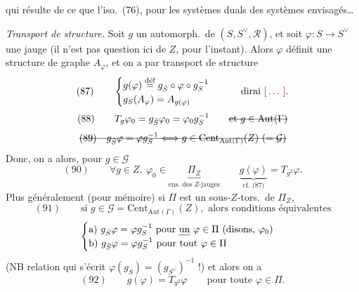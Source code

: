 \documentclass[11pt,a4paper]{article}
\begin{document}
qui résulte de ce que l'iso.\ (76), pour les systèmes
duals des systèmes envisagés…

\struck{\ill{} \ill{}}

\emph{Transport de structure.} Soit $g$ un automorph.\ de $(S, S^{\vee}, \mathcal{R})$,
et soit $\varphi : S \to S^{\vee}$ une jauge (il n'est pas question ici de $Z$,
pour l'instant). Alors $\varphi$ définit une structure de graphe $A_\varphi$, et
on a par transport de structure
\[
(87)\qquad
\begin{cases}
g(\varphi) \overset{\text{déf}}{=} g_{\check{S}} \circ \varphi \circ g_S^{-1} \\
g_S(A_\varphi) = A_{g(\varphi)}
\end{cases}
\qquad \text{dirai \ill{}.}
\]
\[
(88)\qquad T_g \varphi_0 = g_{\check{S}} \varphi_0 = \varphi_0 g_S^{-1}
\qquad \text{\struck{et $g \in \mathrm{Aut}(\Gamma)$}}
\]
\[
\text{\struck{$(89)\quad g_{\check{S}} \varphi = \varphi g_S^{-1} \Longleftrightarrow g \in \mathrm{Cent}_{\mathrm{Aut}(\Gamma)}(Z)\ (= \mathcal{G})$}}
\]
Donc, on a alors, pour $g \in \mathcal{G}$
\[
(90)\qquad \forall g \in Z,\ \varphi_0 \in \underbrace{\Pi_Z}_{\text{ens.\ des } Z\text{-jauges}}
\qquad \underbrace{g(\varphi)}_{\text{cf.\ (87)}} = T_{g^2}\varphi .
\]
Plus généralement (pour mémoire) si $\Pi$ est un sous-$Z$-tors.\ de $\Pi_Z$,
\[
(91)\qquad \text{si } g \in \mathcal{G} = \mathrm{Cent}_{\mathrm{Aut}(\Gamma)}(Z), \text{ alors conditions équivalentes}
\]
\[
\begin{cases}
\text{a) } g_{\check{S}} \varphi = \varphi g_S^{-1} \text{ pour \emph{un} } \varphi \in \Pi \ (\text{disons, } \varphi_0) \\
\text{b) } g_{\check{S}} \varphi = \varphi g_S^{-1} \text{ pour tout } \varphi \in \Pi
\end{cases}
\]
(NB relation qui s'écrit $\varphi(g_S) = (g_{S^{\vee}})^{-1}$ !) et alors on a
\[
(92)\qquad g(\varphi) = T_{g^2}\varphi \qquad \text{pour toute } \varphi \in \Pi .
\]
\end{document}
